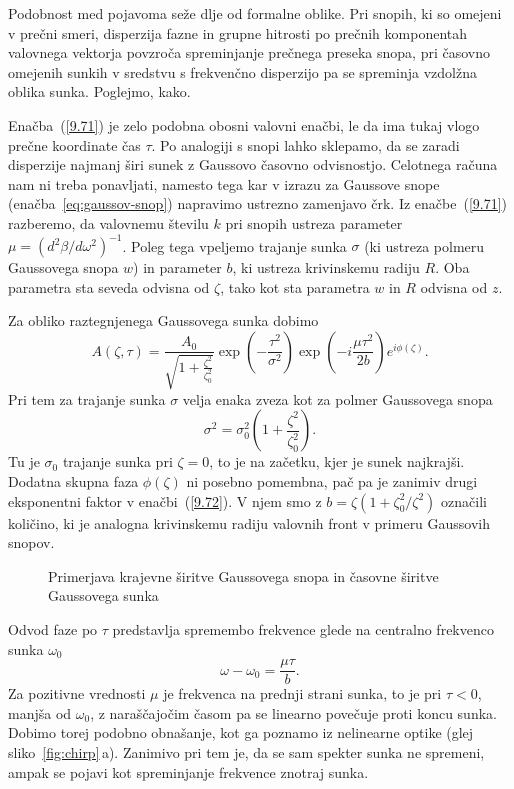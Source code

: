 Podobnost med pojavoma seže dlje od formalne oblike. Pri snopih, ki so omejeni 
v prečni smeri, disperzija fazne in grupne hitrosti po prečnih komponentah valovnega
vektorja povzroča spreminjanje prečnega preseka snopa, pri časovno
omejenih sunkih v sredstvu s frekvenčno disperzijo pa se spreminja
vzdolžna oblika sunka. Poglejmo, kako.

Enačba~(\ref{9.71}) je zelo podobna obosni valovni enačbi, le da ima tukaj vlogo 
prečne koordinate čas $\tau$. Po analogiji s snopi lahko sklepamo, da se zaradi
disperzije najmanj širi sunek z Gaussovo časovno odvisnostjo. Celotnega računa
nam ni treba ponavljati, namesto tega kar v izrazu za Gaussove snope 
(enačba~\ref{eq:gaussov-snop}) napravimo ustrezno zamenjavo črk. 
Iz enačbe~(\ref{9.71}) razberemo, da valovnemu številu $k$ pri snopih  
ustreza parameter $\mu=(d^{2}\beta/d\omega^{2})^{-1}$. Poleg tega vpeljemo
trajanje sunka $\sigma$ (ki ustreza polmeru Gaussovega snopa $w$) in parameter
$b$, ki ustreza krivinskemu radiju $R$. Oba parametra sta seveda odvisna od $\zeta$, 
tako kot sta parametra $w$ in $R$ odvisna od $z$. 

Za obliko raztegnjenega Gaussovega sunka dobimo 
\begin{equation}
A\left(\zeta,\tau\right)=\frac{A_{0}}{\sqrt{1+\frac{\zeta^{2}
}{\zeta_{0}^{2}}}}\exp\left(-\frac{\tau^{2}}{\sigma^{2}}\right)\exp
\left(-i\frac{\mu\tau^{2}}{2b}\right)e^{i\phi\left(\zeta\right)}.
\label{9.72}
\end{equation}
Pri tem za trajanje sunka $\sigma$ velja enaka zveza kot za polmer Gaussovega snopa
\begin{equation}
\sigma^{2}=\sigma_{0}^{2}\left(1+\frac{\zeta^{2}}{\zeta_{0}^{2}}\right).
\label{9.73}
\end{equation}
Tu je $\sigma_{0}$ trajanje sunka pri $\zeta=0$, to je na začetku,
kjer je sunek najkrajši. Dodatna skupna faza $\phi\left(\zeta\right)$
ni posebno pomembna, pač pa je zanimiv drugi eksponentni faktor v
enačbi~(\ref{9.72}). V njem smo z $b=\zeta\left(1+\zeta_{0}^{2}/\zeta^{2}\right)$
označili količino, ki je analogna krivinskemu radiju valovnih front
v primeru Gaussovih snopov. 
\begin{figure}[h]
\centering
\def\svgwidth{120truemm} 

\caption{Primerjava krajevne širitve Gaussovega snopa in časovne širitve Gaussovega sunka}
\label{fig:Gausstau}
\end{figure}

Odvod faze po $\tau$ predstavlja spremembo
frekvence glede na centralno frekvenco sunka $\omega_{0}$
\begin{equation}
\omega-\omega_{0}=\frac{\mu\tau}{b}.
\label{9.74}
\end{equation}
Za pozitivne vrednosti $\mu$ je frekvenca na prednji strani sunka,
to je pri $\tau<0$, manjša od $\omega_0$, z naraščajočim časom pa se 
linearno povečuje proti koncu sunka.
Dobimo torej podobno obnašanje, kot ga poznamo iz nelinearne optike
(glej sliko~\ref{fig:chirp}\,a). Zanimivo pri tem je, da se sam spekter
sunka ne spremeni, ampak se pojavi kot spreminjanje frekvence znotraj sunka.


